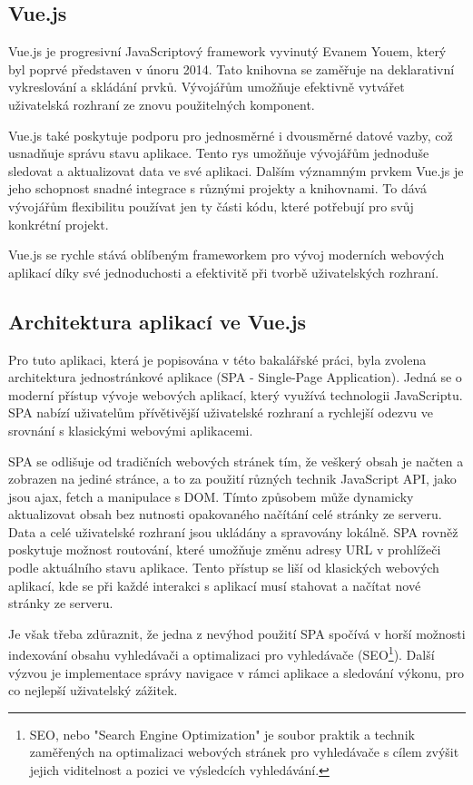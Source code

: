 \subsection{Vue.js}
Vue.js je progresivní JavaScriptový framework vyvinutý Evanem Youem, který byl poprvé představen v únoru 2014. 
Tato knihovna se zaměřuje na deklarativní vykreslování a skládání prvků. Vývojářům umožňuje efektivně vytvářet uživatelská rozhraní ze znovu použitelných komponent.

Vue.js také poskytuje podporu pro jednosměrné i dvousměrné datové vazby, což usnadňuje správu stavu aplikace. Tento rys umožňuje vývojářům jednoduše sledovat a aktualizovat data ve své aplikaci. Dalším významným prvkem Vue.js je jeho schopnost snadné integrace s různými projekty a knihovnami. To dává vývojářům flexibilitu používat jen ty části kódu, které potřebují pro svůj konkrétní projekt.

Vue.js se rychle stává oblíbeným frameworkem pro vývoj moderních webových aplikací díky své jednoduchosti a efektivitě při tvorbě uživatelských rozhraní.\cite{Vue.js}

\subsection{Architektura aplikací ve Vue.js}
Pro tuto aplikaci, která je popisována v této bakalářské práci, byla zvolena architektura jednostránkové aplikace (SPA - Single-Page Application). Jedná se o moderní přístup vývoje webových aplikací, který využívá technologii JavaScriptu. SPA nabízí uživatelům přívětivější uživatelské rozhraní a rychlejší odezvu ve srovnání s klasickými webovými aplikacemi.

SPA se odlišuje od tradičních webových stránek tím, že veškerý obsah je načten a zobrazen na jediné stránce, a to za použití různých technik JavaScript API, jako jsou ajax, fetch a manipulace s DOM. Tímto způsobem může dynamicky aktualizovat obsah bez nutnosti opakovaného načítání celé stránky ze serveru. Data a celé uživatelské rozhraní jsou ukládány a spravovány lokálně. SPA rovněž poskytuje možnost routování, které umožňuje změnu adresy URL v prohlížeči podle aktuálního stavu aplikace. Tento přístup se liší od klasických webových aplikací, kde se při každé interakci s aplikací musí stahovat a načítat nové stránky ze serveru.

Je však třeba zdůraznit, že jedna z nevýhod použití SPA spočívá v horší možnosti indexování obsahu vyhledávači a optimalizaci pro vyhledávače (SEO\footnote{
SEO, nebo "Search Engine Optimization" je soubor praktik a technik zaměřených na optimalizaci webových stránek pro vyhledávače s cílem zvýšit jejich viditelnost a pozici ve výsledcích vyhledávání.}). Další výzvou je implementace správy navigace v rámci aplikace a sledování výkonu, pro co nejlepší uživatelský zážitek. \cite{MDN_spa_2023}

